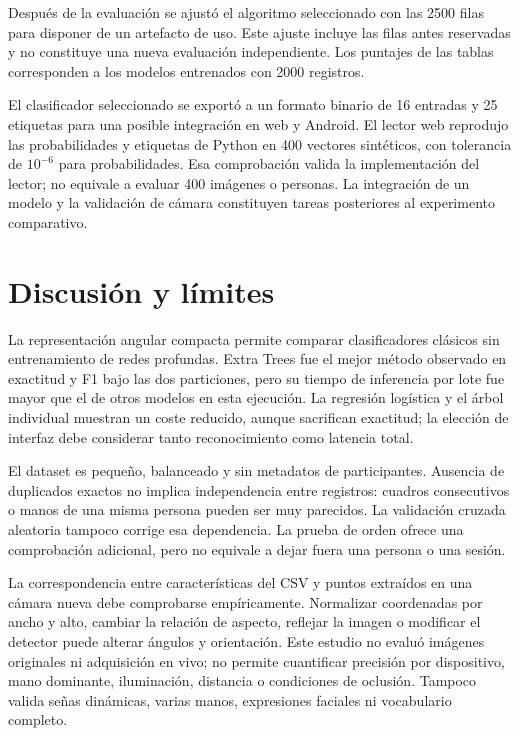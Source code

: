 \documentclass[11pt,a4paper]{article}
\begin{document}
Después de la evaluación se ajustó el algoritmo seleccionado con las 2500 filas para disponer de un artefacto de uso. Este ajuste incluye las filas antes reservadas y no constituye una nueva evaluación independiente. Los puntajes de las tablas corresponden a los modelos entrenados con 2000 registros.

El clasificador seleccionado se exportó a un formato binario de 16 entradas y 25 etiquetas para una posible integración en web y Android. El lector web reprodujo las probabilidades y etiquetas de Python en 400 vectores sintéticos, con tolerancia de $10^{-6}$ para probabilidades. Esa comprobación valida la implementación del lector; no equivale a evaluar 400 imágenes o personas. La integración de un modelo y la validación de cámara constituyen tareas posteriores al experimento comparativo.

\section{Discusión y límites}
La representación angular compacta permite comparar clasificadores clásicos sin entrenamiento de redes profundas. Extra Trees fue el mejor método observado en exactitud y F1 bajo las dos particiones, pero su tiempo de inferencia por lote fue mayor que el de otros modelos en esta ejecución. La regresión logística y el árbol individual muestran un coste reducido, aunque sacrifican exactitud; la elección de interfaz debe considerar tanto reconocimiento como latencia total.

El dataset es pequeño, balanceado y sin metadatos de participantes. Ausencia de duplicados exactos no implica independencia entre registros: cuadros consecutivos o manos de una misma persona pueden ser muy parecidos. La validación cruzada aleatoria tampoco corrige esa dependencia. La prueba de orden ofrece una comprobación adicional, pero no equivale a dejar fuera una persona o una sesión.

La correspondencia entre características del CSV y puntos extraídos en una cámara nueva debe comprobarse empíricamente. Normalizar coordenadas por ancho y alto, cambiar la relación de aspecto, reflejar la imagen o modificar el detector puede alterar ángulos y orientación. Este estudio no evaluó imágenes originales ni adquisición en vivo; no permite cuantificar precisión por dispositivo, mano dominante, iluminación, distancia o condiciones de oclusión. Tampoco valida señas dinámicas, varias manos, expresiones faciales ni vocabulario completo.
\end{document}
